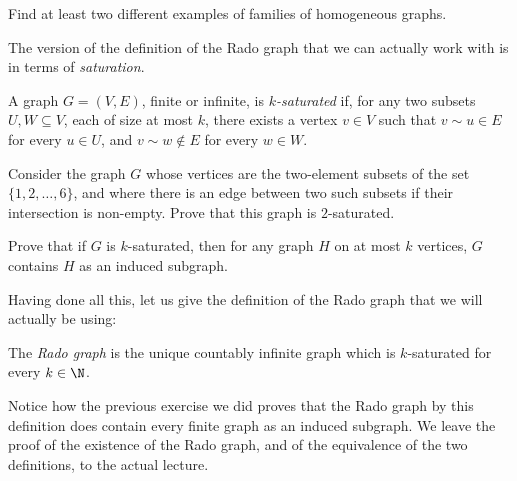 \documentclass[nobib]{tufte-handout}
\begin{document}
\begin{xca}
  Find at least two different examples of families of homogeneous graphs.
\end{xca}

The version of the definition of the Rado graph that we can actually work with is in terms of \emph{saturation}.

\begin{definition}
  A graph $G = (V,E)$, finite or infinite, is \emph{$k$-saturated} if, for any two subsets $U, W \subseteq V$, each of size at most $k$, there exists a vertex $v \in V$ such that $v \sim u \in E$ for every $u \in U$, and $v \sim w \not\in E$ for every $w \in W$.
\end{definition}

\begin{xca}
  Consider the graph $G$ whose vertices are the two-element subsets of the set $\{1,2,\ldots,6\}$, and where there is an edge between two such subsets if their intersection is non-empty. Prove that this graph is $2$-saturated.
\end{xca}

\begin{xca}
  Prove that if $G$ is $k$-saturated, then for any graph $H$ on at most $k$ vertices, $G$ contains $H$ as an induced subgraph.
\end{xca}

Having done all this, let us give the definition of the Rado graph that we will actually be using:

\begin{definition}
  The \emph{Rado graph} is the unique countably infinite graph which is $k$-saturated for every $k \in \N$.
\end{definition}

Notice how the previous exercise we did proves that the Rado graph by this definition does contain every finite graph as an induced subgraph. We leave the proof of the existence of the Rado graph, and of the equivalence of the two definitions, to the actual lecture.


%
%
\end{document}
